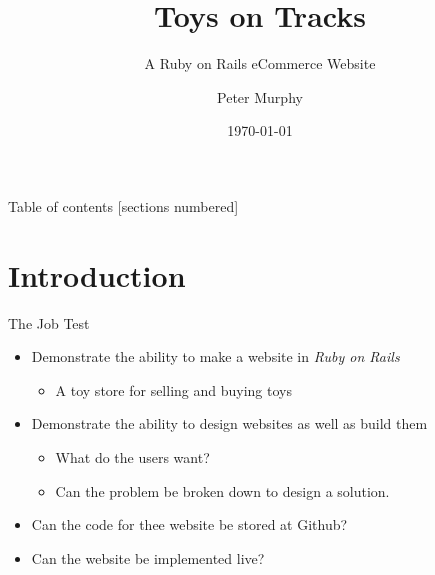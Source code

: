 \documentclass[10pt]{beamer}
\title{Toys on Tracks}
\subtitle{A Ruby on Rails eCommerce Website}
\date{\today}
\author{Peter Murphy}
\institute{Center for modern beamer themes}
\begin{document}
\maketitle

\begin{frame}{Table of contents}
  [sections numbered]
  \tableofcontents[hideallsubsections]
\end{frame}

\section{Introduction}

\begin{frame}[fragile]{The Job Test}

	\begin{itemize}
		\item Demonstrate the ability to make a website in \emph{Ruby on Rails}
    	\begin{itemize}
		\item A toy store for selling and buying toys
	\end{itemize}
		\item Demonstrate the ability to design websites as well as build them
    	\begin{itemize}
		    \item What do the users want?
    		\item Can the problem be broken down to design a solution.
	\end{itemize}
  \item Can the code for thee website be stored at Github?
  \item Can the website be implemented live?
  
	\end{itemize}

\end{frame}
\end{document}
